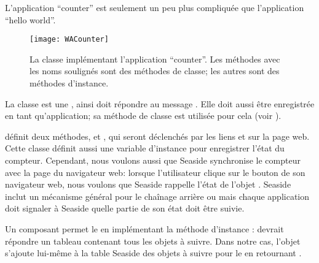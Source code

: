 \documentclass[a4paper,10pt,twoside]{book}
\begin{document}
L'application ``counter'' est seulement un peu plus compliquée que
l'application ``hello world''.

\begin{figure}[ht]
\begin{center}
\texttt{[image: WACounter]}
\caption{La classe  implémentant l'application
  ``counter''. Les méthodes avec les noms soulignés sont des méthodes
  de classe; les autres sont des méthodes d'instance.}
\end{center}
\end{figure}

La classe   est une ,
ainsi  doit répondre  au message 
 .
Elle doit aussi être enregistrée en tant qu'application; sa méthode de
classe  est utilisée pour cela (voir
).

 définit deux méthodes,  et ,
qui seront déclenchés par les liens \link{++} et \link{--\,--} sur la
page web.
Cette classe définit aussi une variable d'instance 
  pour enregistrer l'état du compteur.
Cependant, nous voulons aussi que Seaside synchronise le compteur avec la page du navigateur web:
lorsque l'utilisateur clique sur le bouton \backbtn{} de son
navigateur web, nous voulons que Seaside rappelle l'état de l'objet
.
Seaside inclut un mécanisme général pour le chaînage arrière ou
\backtracking mais chaque application doit signaler à Seaside quelle
partie de son état doit être suivie.

Un composant permet le \backtracking en implémentant la méthode
d'instance :
 devrait répondre un tableau contenant tous les objets à
suivre. Dans notre cas, l'objet  s'ajoute lui-même à la
table Seaside des objets à suivre pour le \backtracking en retournant
.
\end{document}
